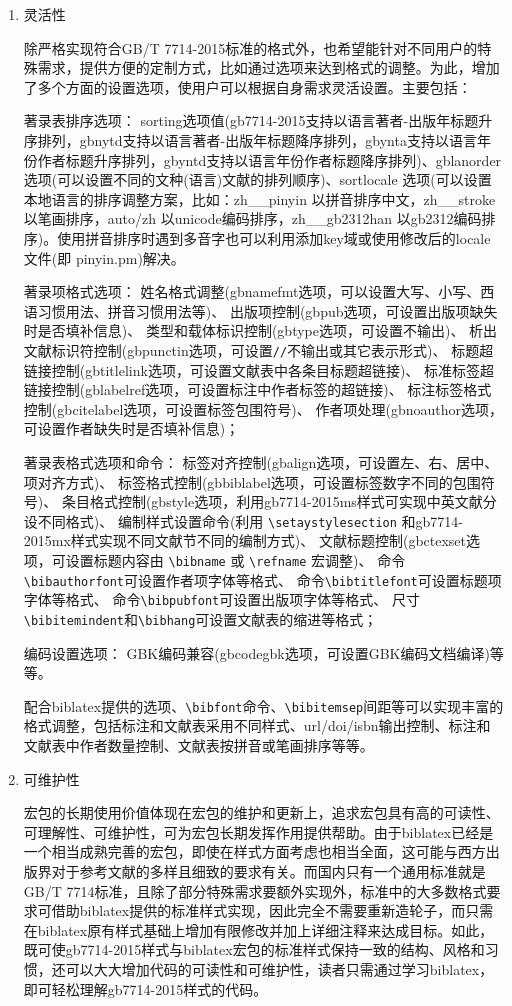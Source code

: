 \documentclass[11pt]{article} %
\begin{document}
\begin{enumerate}
  \item 灵活性

除严格实现符合GB/T 7714-2015标准的格式外，也希望能针对不同用户的特殊需求，提供方便的定制方式，比如通过选项来达到格式的调整。为此，增加了多个方面的设置选项，使用户可以根据自身需求灵活设置。主要包括：

著录表排序选项：
sorting选项值(gb7714-2015支持以语言著者-出版年标题升序排列，gbnytd支持以语言著者-出版年标题降序排列，gbynta支持以语言年份作者标题升序排列，gbyntd支持以语言年份作者标题降序排列)、gblanorder 选项(可以设置不同的文种(语言)文献的排列顺序)、sortlocale 选项(可以设置本地语言的排序调整方案，比如：zh\_\_pinyin 以拼音排序中文，zh\_\_stroke 以笔画排序，auto/zh 以unicode编码排序，zh\_\_gb2312han 以gb2312编码排序)。使用拼音排序时遇到多音字也可以利用添加key域或使用修改后的locale文件(即 pinyin.pm)解决。


著录项格式选项：
姓名格式调整(gbnamefmt选项，可以设置大写、小写、西语习惯用法、拼音习惯用法等)、
出版项控制(gbpub选项，可设置出版项缺失时是否填补信息)、
类型和载体标识控制(gbtype选项，可设置不输出)、
析出文献标识符控制(gbpunctin选项，可设置\texttt{//}不输出或其它表示形式)、
标题超链接控制(gbtitlelink选项，可设置文献表中各条目标题超链接)、
标准标签超链接控制(gblabelref选项，可设置标注中作者标签的超链接)、
标注标签格式控制(gbcitelabel选项，可设置标签包围符号)、
作者项处理(gbnoauthor选项，可设置作者缺失时是否填补信息)；

著录表格式选项和命令：
标签对齐控制(gbalign选项，可设置左、右、居中、项对齐方式)、
标签格式控制(gbbiblabel选项，可设置标签数字不同的包围符号)、
条目格式控制(gbstyle选项，利用gb7714-2015ms样式可实现中英文献分设不同格式)、
编制样式设置命令(利用 \verb|\setaystylesection| 和gb7714-2015mx样式实现不同文献节不同的编制方式)、
文献标题控制(gbctexset选项，可设置标题内容由 \verb|\bibname| 或 \verb|\refname| 宏调整)、
命令\verb|\bibauthorfont|可设置作者项字体等格式、
命令\verb|\bibtitlefont|可设置标题项字体等格式、
命令\verb|\bibpubfont|可设置出版项字体等格式、
尺寸\verb|\bibitemindent|和\verb|\bibhang|可设置文献表的缩进等格式；

编码设置选项：
GBK编码兼容(gbcodegbk选项，可设置GBK编码文档编译)等等。

配合biblatex提供的选项、\verb|\bibfont|命令、\verb|\bibitemsep|间距等可以实现丰富的格式调整，包括标注和文献表采用不同样式、url/doi/isbn输出控制、标注和文献表中作者数量控制、文献表按拼音或笔画排序等等。


  \item 可维护性

宏包的长期使用价值体现在宏包的维护和更新上，追求宏包具有高的可读性、可理解性、可维护性，可为宏包长期发挥作用提供帮助。由于biblatex已经是一个相当成熟完善的宏包，即使在样式方面考虑也相当全面，这可能与西方出版界对于参考文献的多样且细致的要求有关。而国内只有一个通用标准就是GB/T 7714标准，且除了部分特殊需求要额外实现外，标准中的大多数格式要求可借助biblatex提供的标准样式实现，因此完全不需要重新造轮子，而只需在biblatex原有样式基础上增加有限修改并加上详细注释来达成目标。如此，既可使gb7714-2015样式与biblatex宏包的标准样式保持一致的结构、风格和习惯，还可以大大增加代码的可读性和可维护性，读者只需通过学习biblatex，即可轻松理解gb7714-2015样式的代码。



\end{enumerate}
\end{document}
